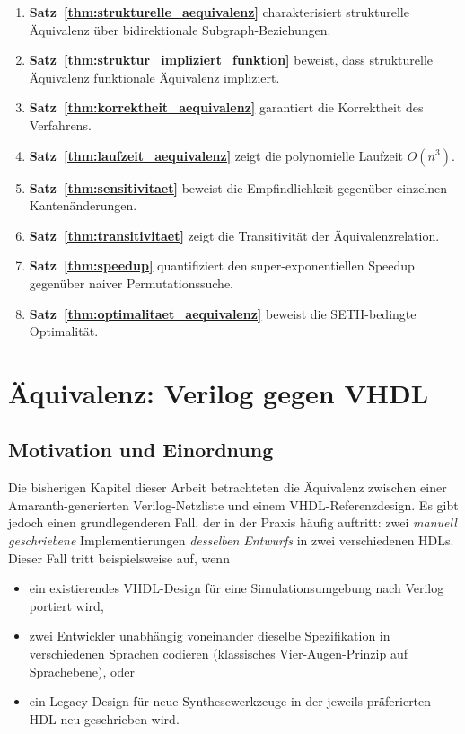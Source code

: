 ﻿\documentclass[12pt,a4paper]{report}
\begin{document}
\begin{enumerate}
    \item \textbf{Satz~\ref{thm:strukturelle_aequivalenz}} charakterisiert strukturelle Äquivalenz über bidirektionale Subgraph-Beziehungen.
    \item \textbf{Satz~\ref{thm:struktur_impliziert_funktion}} beweist, dass strukturelle Äquivalenz funktionale Äquivalenz impliziert.
    \item \textbf{Satz~\ref{thm:korrektheit_aequivalenz}} garantiert die Korrektheit des Verfahrens.
    \item \textbf{Satz~\ref{thm:laufzeit_aequivalenz}} zeigt die polynomielle Laufzeit $O(n^3)$.
    \item \textbf{Satz~\ref{thm:sensitivitaet}} beweist die Empfindlichkeit gegenüber einzelnen Kantenänderungen.
    \item \textbf{Satz~\ref{thm:transitivitaet}} zeigt die Transitivität der Äquivalenzrelation.
    \item \textbf{Satz~\ref{thm:speedup}} quantifiziert den super-exponentiellen Speedup gegenüber naiver Permutationssuche.
    \item \textbf{Satz~\ref{thm:optimalitaet_aequivalenz}} beweist die SETH-bedingte Optimalität.
\end{enumerate}

\chapter{Äquivalenz: Verilog gegen VHDL}
\label{sec:verilog_vhdl_direkt}

\section{Motivation und Einordnung}

Die bisherigen Kapitel dieser Arbeit betrachteten die Äquivalenz zwischen einer
Amaranth-generierten Verilog-Netzliste und einem VHDL-Referenzdesign.  Es gibt
jedoch einen grundlegenderen Fall, der in der Praxis häufig auftritt: zwei
\emph{manuell geschriebene} Implementierungen \emph{desselben Entwurfs} in zwei
verschiedenen HDLs.  Dieser Fall tritt beispielsweise auf, wenn

\begin{itemize}
	\item ein existierendes VHDL-Design für eine Simulationsumgebung nach Verilog
	portiert wird,
	\item zwei Entwickler unabhängig voneinander dieselbe Spezifikation in
	verschiedenen Sprachen codieren (klassisches Vier-Augen-Prinzip auf
	Sprach\-ebene), oder
	\item ein Legacy-Design für neue Synthesewerkzeuge in der jeweils präferierten
	HDL neu geschrieben wird.
\end{itemize}
\end{document}
